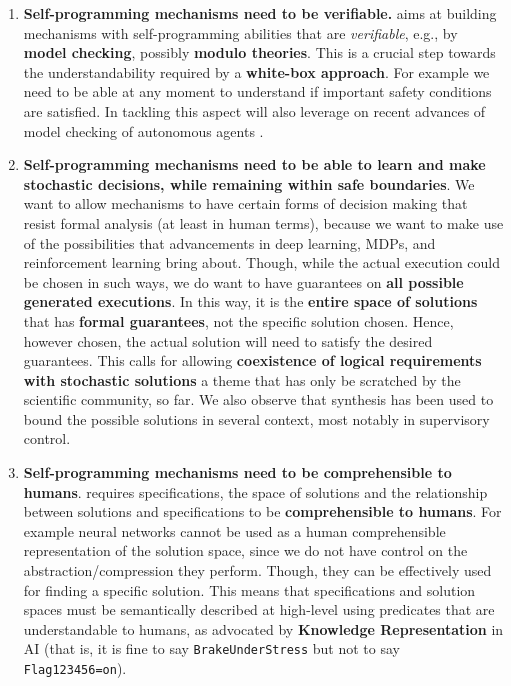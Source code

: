 \begin{enumerate}
\item \textbf{Self-programming mechanisms need to be verifiable.}
  \project aims at building mechanisms with self-programming abilities
  that are \emph{verifiable}, e.g., by \textbf{model checking}, possibly
  \textbf{modulo theories}. %
This is a crucial step towards the
  understandability required by a \textbf{white-box approach}.  For
  example we need to be able at any moment to understand if important
  safety conditions are satisfied. In tackling this aspect \project will also leverage on  recent advances of model checking of autonomous agents  %
\autocite[]{LomuscioQR17}.

\item \textbf{Self-programming mechanisms need to be able to learn and
    make stochastic decisions, while remaining within safe
    boundaries}.  We want to allow mechanisms to have certain forms of
  decision making that resist formal analysis (at least in human
  terms), because we want to make use of the possibilities that
  advancements in deep learning, MDPs, and reinforcement learning
  bring about. Though, while the actual execution could be chosen in such
  ways, we do want to have guarantees on \textbf{all possible
    generated executions}.  In this way, it is the \textbf{entire
    space of solutions} that has \textbf{formal guarantees}, not the
  specific solution chosen. Hence, however chosen, the actual solution
  will need to satisfy the desired guarantees.
  This calls for allowing \textbf{coexistence of logical requirements
    with stochastic solutions} a theme that has only be scratched by
  the scientific community, so far. \autocite[]{BeckL12} \autocite[]{BDMS17}
  We also observe that synthesis has been used to bound the
  possible solutions in several context, most notably in supervisory
  control. \autocite[]{Wo14} \autocite[]{BanihashemiGL16}



\item \textbf{Self-programming mechanisms need to be comprehensible to
    humans}. \project requires specifications, the space of
  solutions and the relationship between solutions and specifications
  to be \textbf{comprehensible to humans}.  For example neural
  networks cannot be used as a human comprehensible representation of
  the solution space, since we do not have control on the
  abstraction/compression they perform. Though, they can be effectively
  used for finding a specific solution.
This means that specifications and solution spaces must be
semantically described at high-level using predicates that are
understandable to humans, as advocated by \textbf{Knowledge
  Representation} in AI (that is, it is fine to say
\texttt{BrakeUnderStress} but not to say \texttt{Flag123456=on}).
\autocite[]{Baral10} \autocite[]{EiterEFS10} \autocite[]{BrewkaEP14} 
 \autocite[]{Shoham16}
\autocite[]{Levesque17}


\end{enumerate}
